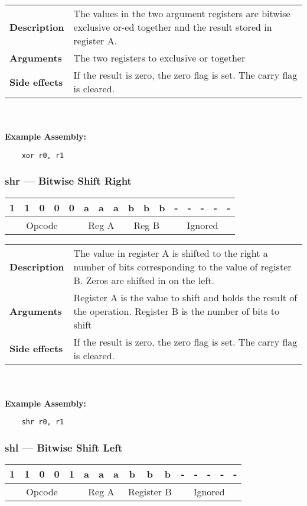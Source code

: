 \documentclass[titlepage]{article}
\begin{document}
\begin{tabular}{l p{8cm}}
{\bf Description} & The values in the two argument registers are bitwise exclusive or-ed together and the result stored in register A. \\
{\bf Arguments} & The two registers to exclusive or together \\
{\bf Side effects} & If the result is zero, the zero flag is set. The carry flag is cleared. \\
\end{tabular}\\ \\
{\bf Example Assembly:}
\begin{verbatim}
    xor r0, r1
\end{verbatim}

\subsubsection{shr --- Bitwise Shift Right}\begin{center}
\begin{tabular}{|c|c|c|c|c|c|c|c|c|c|c|c|c|c|c|c|}
\hline
1 & 1 & 0 & 0 & 0 & a & a & a & b & b & b & - & - & - & - & - \\
\hline
\multicolumn{5}{|c}{Opcode} &
\multicolumn{3}{|c}{Reg A} &
\multicolumn{3}{|c}{Reg B} &
\multicolumn{5}{|c|}{Ignored} \\
\hline
\end{tabular}
\end{center}

\begin{tabular}{l p{8cm}}
{\bf Description} & The value in register A is shifted to the right a number of bits corresponding to the value of register B. Zeros are shifted in on the left. \\
{\bf Arguments} & Register A is the value to shift and holds the result of the operation. Register B is the number of bits to shift \\
{\bf Side effects} & If the result is zero, the zero flag is set. The carry flag is cleared. \\
\end{tabular}\\ \\
{\bf Example Assembly:}
\begin{verbatim}
    shr r0, r1
\end{verbatim}

\subsubsection{shl --- Bitwise Shift Left}\begin{center}
\begin{tabular}{|c|c|c|c|c|c|c|c|c|c|c|c|c|c|c|c|}
\hline
1 & 1 & 0 & 0 & 1 & a & a & a & b & b & b & - & - & - & - & - \\
\hline
\multicolumn{5}{|c}{Opcode} &
\multicolumn{3}{|c}{Reg A} &
\multicolumn{3}{|c}{Register B} &
\multicolumn{5}{|c|}{Ignored} \\
\hline
\end{tabular}
\end{center}
\end{document}
